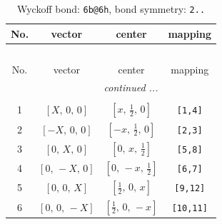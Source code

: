 \documentclass[fleqn,8pt]{jsarticle}
\begin{document}
\begin{longtable}{cccc}
\caption{Wyckoff bond: {\tt 6b@6h}, bond symmetry: {\tt 2..}}
 \\
 \hline \hline
No. & vector & center & mapping \\ \hline \endfirsthead

\multicolumn{3}{l}{\tablename\ \thetable{}} \\
 \hline \hline
No. & vector & center & mapping \\ \hline \endhead

 \hline \hline
\multicolumn{3}{r}{\footnotesize\it continued ...} \\ \endfoot

 \hline \hline
\multicolumn{3}{r}{} \\ \endlastfoot

1 & $\left[ X,\, 0,\, 0 \right]$ & $\left[ x,\, \frac{1}{2},\, 0 \right]$ & {\tt [1,4]} \\ \hline
2 & $\left[ - X,\, 0,\, 0 \right]$ & $\left[ - x,\, \frac{1}{2},\, 0 \right]$ & {\tt [2,3]} \\ \hline
3 & $\left[ 0,\, X,\, 0 \right]$ & $\left[ 0,\, x,\, \frac{1}{2} \right]$ & {\tt [5,8]} \\ \hline
4 & $\left[ 0,\, - X,\, 0 \right]$ & $\left[ 0,\, - x,\, \frac{1}{2} \right]$ & {\tt [6,7]} \\ \hline
5 & $\left[ 0,\, 0,\, X \right]$ & $\left[ \frac{1}{2},\, 0,\, x \right]$ & {\tt [9,12]} \\ \hline
6 & $\left[ 0,\, 0,\, - X \right]$ & $\left[ \frac{1}{2},\, 0,\, - x \right]$ & {\tt [10,11]} \\
\end{longtable}
\renewcommand{\arraystretch}{1.2}
\end{document}
